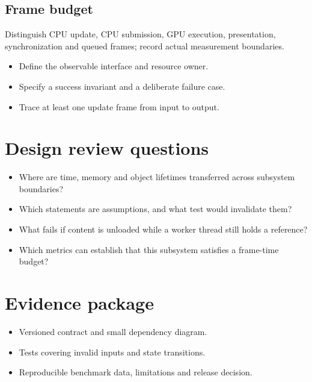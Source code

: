 \documentclass[11pt,letterpaper]{article}
\begin{document}
\subsection{Frame budget}
Distinguish CPU update, CPU submission, GPU execution, presentation, synchronization and queued frames; record actual measurement boundaries.

\begin{itemize}
\item Define the observable interface and resource owner.
\item Specify a success invariant and a deliberate failure case.
\item Trace at least one update frame from input to output.
\end{itemize}
\section{Design review questions}
\begin{itemize}
\item Where are time, memory and object lifetimes transferred across subsystem boundaries?
\item Which statements are assumptions, and what test would invalidate them?
\item What fails if content is unloaded while a worker thread still holds a reference?
\item Which metrics can establish that this subsystem satisfies a frame-time budget?
\end{itemize}
\section{Evidence package}
\begin{itemize}
\item Versioned contract and small dependency diagram.
\item Tests covering invalid inputs and state transitions.
\item Reproducible benchmark data, limitations and release decision.
\end{itemize}
\end{document}
